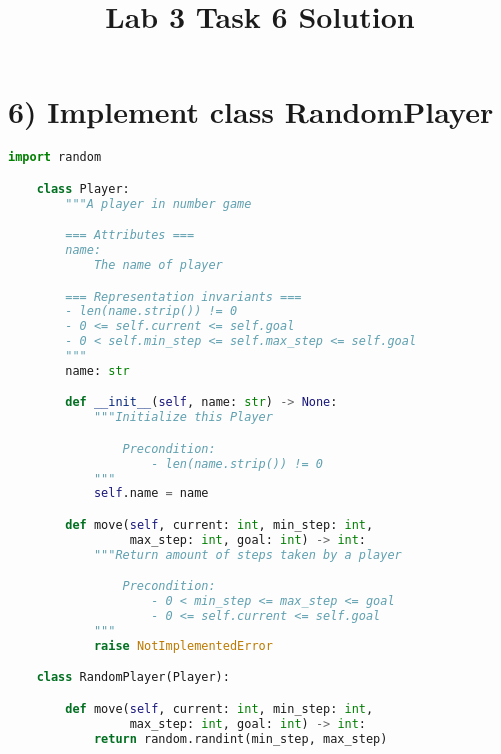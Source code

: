 \documentclass[12pt]{article}
\begin{document}
\title{Lab 3 Task 6 Solution}
\date{}
\maketitle

\section*{6) Implement class RandomPlayer}

\begin{lstlisting}[language=Python, caption={task\_6\_solution.py},captionpos=b]
    import random

    class Player:
        """A player in number game

        === Attributes ===
        name:
            The name of player

        === Representation invariants ===
        - len(name.strip()) != 0
        - 0 <= self.current <= self.goal
        - 0 < self.min_step <= self.max_step <= self.goal
        """
        name: str

        def __init__(self, name: str) -> None:
            """Initialize this Player

                Precondition:
                    - len(name.strip()) != 0
            """
            self.name = name

        def move(self, current: int, min_step: int,
                 max_step: int, goal: int) -> int:
            """Return amount of steps taken by a player

                Precondition:
                    - 0 < min_step <= max_step <= goal
                    - 0 <= self.current <= self.goal
            """
            raise NotImplementedError

    class RandomPlayer(Player):

        def move(self, current: int, min_step: int,
                 max_step: int, goal: int) -> int:
            return random.randint(min_step, max_step)
\end{lstlisting}
\end{document}
